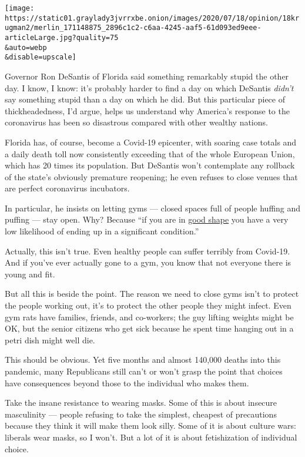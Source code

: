 \texttt{[image: https://static01.graylady3jvrrxbe.onion/images/2020/07/18/opinion/18krugman2/merlin\_171148875\_2896c1c2-c6aa-4245-aaf5-61d093ed9eee-articleLarge.jpg?quality=75\\\&auto=webp\\\&disable=upscale]}

Governor Ron DeSantis of Florida said something remarkably stupid the
other day. I know, I know: it's probably harder to find a day on which
DeSantis \emph{didn't} say something stupid than a day on which he did.
But this particular piece of thickheadedness, I'd argue, helps us
understand why America's response to the coronavirus has been so
disastrous compared with other wealthy nations.

Florida has, of course, become a Covid-19 epicenter, with soaring case
totals and a daily death toll now consistently exceeding that of the
whole European Union, which has 20 times its population. But DeSantis
won't contemplate any rollback of the state's obviously premature
reopening; he even refuses to close venues that are perfect coronavirus
incubators.

In particular, he insists on letting gyms --- closed spaces full of
people huffing and puffing --- stay open. Why? Because ``if you are in
\href{https://www.palmbeachpost.com/news/20200717/despite-11000-new-coronavirus-cases-desantis-defies-white-house-task-force}{good
shape} you have a very low likelihood of ending up in a significant
condition.''

Actually, this isn't true. Even healthy people can suffer terribly from
Covid-19. And if you've ever actually gone to a gym, you know that not
everyone there is young and fit.

But all this is beside the point. The reason we need to close gyms isn't
to protect the people working out, it's to protect the other people they
might infect. Even gym rats have families, friends, and co-workers; the
guy lifting weights might be OK, but the senior citizens who get sick
because he spent time hanging out in a petri dish might well die.

This should be obvious. Yet five months and almost 140,000 deaths into
this pandemic, many Republicans still can't or won't grasp the point
that choices have consequences beyond those to the individual who makes
them.

Take the insane resistance to wearing masks. Some of this is about
insecure masculinity --- people refusing to take the simplest, cheapest
of precautions because they think it will make them look silly. Some of
it is about culture wars: liberals wear masks, so I won't. But a lot of
it is about fetishization of individual choice.

